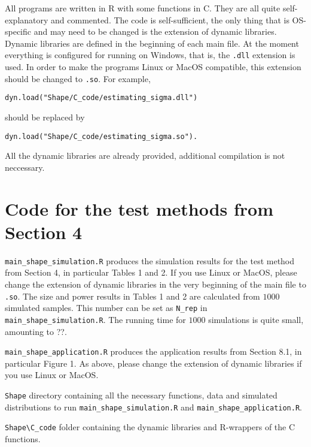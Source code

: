 \documentclass[a4paper,12pt]{article}
\begin{document}
All programs are written in R with some functions in C. They are all quite self-explanatory and commented. The code is self-sufficient, the only thing that is OS-specific and may need to be changed is the extension of dynamic libraries. Dynamic libraries are defined in the beginning of each main file. At the moment everything is configured for running on Windows, that is, the \verb|.dll| extension is used. In order to make the programs Linux or MacOS compatible, this extension should be changed to \verb|.so|. For example, 
\begin{verbatim}
dyn.load("Shape/C_code/estimating_sigma.dll")
\end{verbatim} should be replaced by
\begin{verbatim}
dyn.load("Shape/C_code/estimating_sigma.so").
\end{verbatim}
All the dynamic libraries are already provided, additional  compilation is not neccessary.



\newpage
\section*{Code for the test methods from Section 4}


\setlength{\parskip}{0.3cm}
\everypar{\hangafter=1\hangindent=1.45cm\relax}

\verb|main_shape_simulation.R| \hspace{1pt} produces the simulation results for the test method from Section 4, in particular Tables 1 and 2. If you use Linux or MacOS, please change the extension of dynamic libraries in the very beginning of the main file to \verb|.so|. The size and power results in Tables 1 and 2 are calculated from $1000$ simulated samples. This number can be set as \verb|N_rep| in \verb|main_shape_simulation.R|. The running time for $1000$ simulations is quite small, amounting to ??. 

\verb|main_shape_application.R| \hspace{1pt} produces the application results from Section 8.1, in particular Figure 1. As above, please change the extension of dynamic libraries if you use Linux or MacOS.

\verb|Shape| \hspace{1pt} directory containing all the necessary functions, data and simulated distributions to run \verb|main_shape_simulation.R| and \verb|main_shape_application.R|.

\verb|Shape\C_code| \hspace{1pt} folder containing the dynamic libraries and R-wrappers of the C functions.
\end{document}
